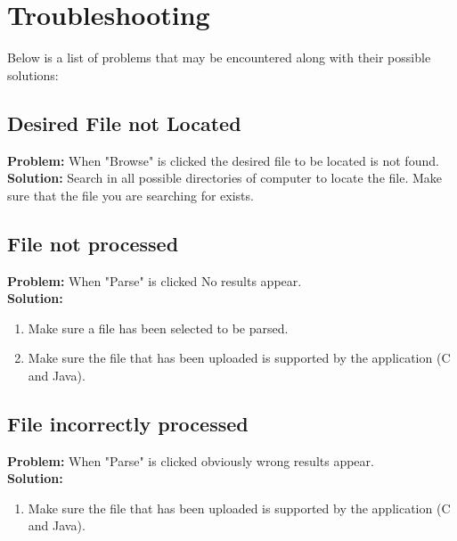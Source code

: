 \documentclass[11pt]{article}
\begin{document}
\section{Troubleshooting}
Below is a list of problems that may be encountered along with their possible solutions:
\subsection{Desired File not Located}
\textbf{Problem:} When "Browse" is clicked the desired file to be located is not found. \\
\textbf{Solution: } Search in all possible directories of computer to locate the file. Make sure that the file you are searching for exists. \\

\subsection{File not processed}
\textbf{Problem:} When "Parse" is clicked No results appear. \\
\textbf{Solution: } \begin{enumerate}
\item Make sure a file has been selected to be parsed.
\item Make sure the file that has been uploaded is supported by the application (C and Java).
\end{enumerate} 

\subsection{File incorrectly processed}
\textbf{Problem:} When "Parse" is clicked obviously wrong results appear. \\
\textbf{Solution: } \begin{enumerate}
\item Make sure the file that has been uploaded is supported by the application (C and Java).
\end{enumerate} 
\end{document}
